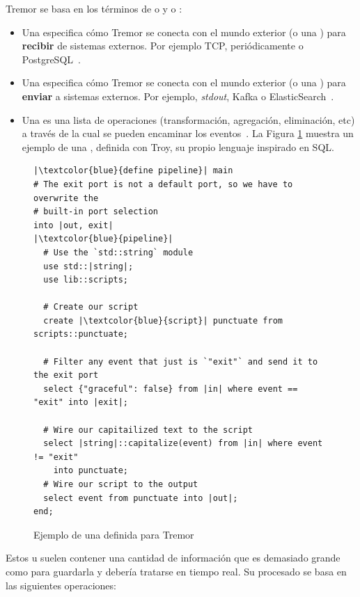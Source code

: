 Tremor se basa en los términos de \onramps o \sources y \offramps o \sinks:

\begin{itemize}
    \item Una \onramp especifica cómo Tremor se conecta con el mundo exterior (o
        una \pipeline) para \textbf{recibir} de sistemas externos. Por ejemplo
        TCP, periódicamente o PostgreSQL~\cite{tremoronramps}.

    \item Una \offramp especifica cómo Tremor se conecta con el mundo exterior
        (o una \pipeline) para \textbf{enviar} a sistemas externos. Por ejemplo,
        \emph{stdout}, Kafka o ElasticSearch~\cite{tremorofframps}.

    \item Una \pipeline es una lista de operaciones (transformación, agregación,
        eliminación, etc) a través de la cual se pueden encaminar los
        eventos~\cite{tremorpipelines}. La Figura \ref{fig:tremor_pipeline}
        muestra un ejemplo de una \pipeline, definida con Troy, su propio
        lenguaje inspirado en SQL.

\end{itemize}

\begin{figure}
    \centering
    \begin{verbatim}
|\textcolor{blue}{define pipeline}| main
# The exit port is not a default port, so we have to overwrite the
# built-in port selection
into |out, exit|
|\textcolor{blue}{pipeline}|
  # Use the `std::string` module
  use std::|string|;
  use lib::scripts;

  # Create our script
  create |\textcolor{blue}{script}| punctuate from scripts::punctuate;

  # Filter any event that just is `"exit"` and send it to the exit port
  select {"graceful": false} from |in| where event == "exit" into |exit|;

  # Wire our capitailized text to the script
  select |string|::capitalize(event) from |in| where event != "exit"
    into punctuate;
  # Wire our script to the output
  select event from punctuate into |out|;
end;
    \end{verbatim}
    \caption{Ejemplo de una \pipeline definida para Tremor}%
    \label{fig:tremor_pipeline}
\end{figure}

Estos \onramps u \offramps suelen contener una cantidad de información que es
demasiado grande como para guardarla y debería tratarse en tiempo real. Su
procesado se basa en las siguientes operaciones:

